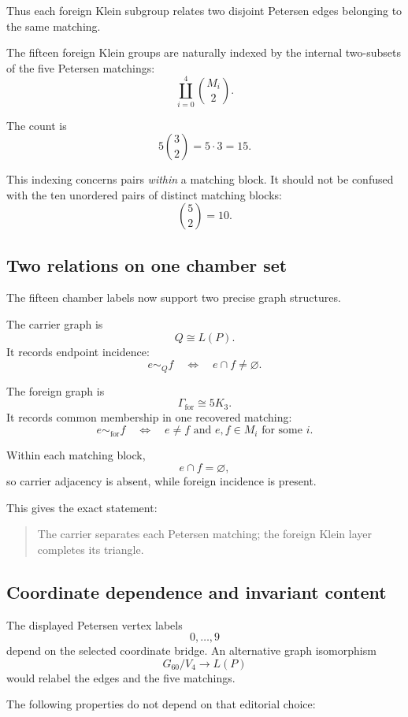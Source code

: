 Thus each foreign Klein subgroup relates two disjoint Petersen edges
belonging to the same matching.

\begin{proposition}
The fifteen foreign Klein groups are naturally indexed by the internal
two-subsets of the five Petersen matchings:
\[
\coprod_{i=0}^4 \binom{M_i}{2}.
\]
\end{proposition}

The count is
\[
5\binom32
=
5\cdot3
=
15.
\]

This indexing concerns pairs \emph{within} a matching block. It should
not be confused with the ten unordered pairs of distinct matching
blocks:
\[
\binom52=10.
\]

\subsection{Two relations on one chamber set}

The fifteen chamber labels now support two precise graph structures.

The carrier graph is
\[
Q\cong L(P).
\]
It records endpoint incidence:
\[
e\sim_Q f
\quad\Longleftrightarrow\quad
e\cap f\neq\varnothing.
\]

The foreign graph is
\[
\Gamma_{\mathrm{for}}\cong5K_3.
\]
It records common membership in one recovered matching:
\[
e\sim_{\mathrm{for}}f
\quad\Longleftrightarrow\quad
e\neq f
\text{ and }
e,f\in M_i
\text{ for some }i.
\]

Within each matching block,
\[
e\cap f=\varnothing,
\]
so carrier adjacency is absent, while foreign incidence is present.

This gives the exact statement:

\begin{quote}
The carrier separates each Petersen matching; the foreign Klein layer
completes its triangle.
\end{quote}

\subsection{Coordinate dependence and invariant content}

The displayed Petersen vertex labels
\[
0,\ldots,9
\]
depend on the selected coordinate bridge. An alternative graph
isomorphism
\[
G_{60}/V_4\longrightarrow L(P)
\]
would relabel the edges and the five matchings.

The following properties do not depend on that editorial choice:

